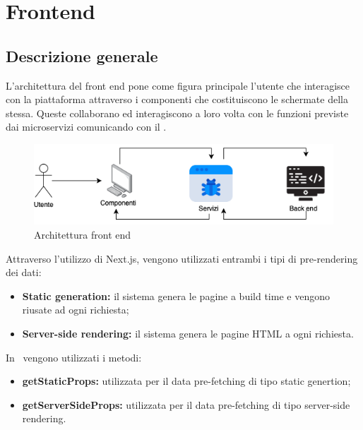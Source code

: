 \newpage
\section{Frontend}\label{Frontend}
\subsection{Descrizione generale}
L'architettura del front end pone come figura principale l'utente che interagisce con la piattaforma attraverso i componenti che costituiscono le schermate della stessa. Queste collaborano ed interagiscono a loro volta con le funzioni previste dai microservizi comunicando con il .
\begin{figure}[H]
	\centering
	\includegraphics[scale=0.6]{Immagini/Frontend/fe.png}
	\caption{Architettura front end}
	\label{fig:fe}
\end{figure}
Attraverso l'utilizzo di Next.js, vengono utilizzati entrambi i tipi di pre-rendering dei dati: 
\begin{itemize}
	\item \textbf{Static generation:} il sistema genera le pagine  a build time e vengono riusate ad ogni richiesta;
	\item \textbf{Server-side rendering:} il sistema genera le pagine HTML a ogni richiesta.
\end{itemize}
In \NomeProgetto\ vengono utilizzati i metodi:
\begin{itemize}
	\item \textbf{getStaticProps:} utilizzata per il data pre-fetching di tipo static genertion;
	\item \textbf{getServerSideProps:} utilizzata per il data pre-fetching di tipo server-side rendering.
\end{itemize}
